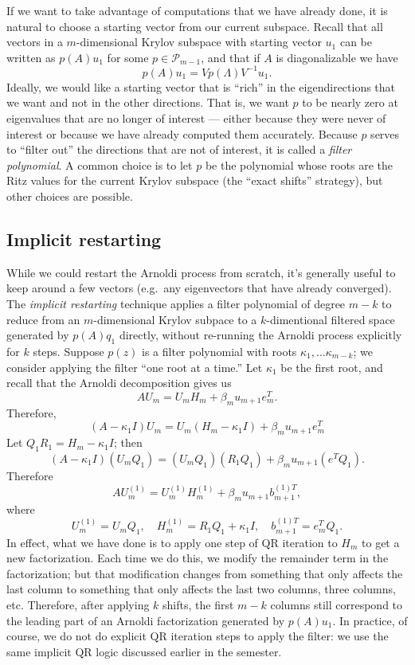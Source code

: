 \documentclass[12pt, leqno]{article} %
\begin{document}
If we want to take advantage of computations that we have already
done, it is natural to choose a starting vector from our current
subspace.  Recall that all vectors in a $m$-dimensional Krylov
subspace with starting vector $u_1$ can be written as $p(A) u_1$ for
some $p \in \mathcal{P}_{m-1}$, and that if $A$ is diagonalizable we
have
\[
  p(A) u_1 = V p(\Lambda) V^{-1} u_1.
\]
Ideally, we would like a starting vector that is ``rich'' in the
eigendirections that we want and not in the other directions.  That is,
we want $p$ to be nearly zero at eigenvalues that are no longer of
interest --- either because they were never of interest or because we
have already computed them accurately.  Because $p$ serves to ``filter
out'' the directions that are not of interest, it is called
a {\em filter polynomial}.  A common choice is to let $p$ be the
polynomial whose roots are the Ritz values for the current Krylov
subspace (the ``exact shifts'' strategy), but other choices are possible.

\subsection{Implicit restarting}

While we could restart the Arnoldi process from scratch, it's
generally useful to keep around a few vectors (e.g.~any eigenvectors
that have already converged).  The {\em implicit restarting} technique
applies a filter polynomial of degree $m-k$ to reduce from an
$m$-dimensional Krylov subpace to a $k$-dimentional filtered space
generated by $p(A) q_1$ directly, without re-running the Arnoldi
process explicitly for $k$ steps.  Suppose $p(z)$ is a filter
polynomial with roots $\kappa_1, \ldots \kappa_{m-k}$; we consider
applying the filter ``one root at a time.''  Let $\kappa_1$ be the
first root, and recall that the Arnoldi decomposition gives us
\[
  A U_m = U_m H_m + \beta_m u_{m+1} e_m^T.
\]
Therefore,
\[
  (A-\kappa_1 I) U_m = U_m (H_m - \kappa_1 I) + \beta_m u_{m+1} e_m^T
\]
Let $Q_1 R_1 = H_m - \kappa_1 I$; then
\[
  (A-\kappa_1 I) (U_m Q_1) = (U_m Q_1) (R_1 Q_1) + \beta_m u_{m+1} (e^T Q_1).
\]
Therefore
\[
  A U_m^{(1)} = U_m^{(1)} H_m^{(1)} + \beta_m u_{m+1} b_{m+1}^{(1) T},
\]
where
\[
  U_m^{(1)} = U_m Q_1, \quad
  H_m^{(1)} = R_1 Q_1 + \kappa_1 I, \quad
  b_{m+1}^{(1) T} = e_m^T Q_1.
\]
In effect, what we have done is to apply one step of QR iteration to
$H_m$ to get a new factorization.  Each time we do this, we modify the
remainder term in the factorization; but that modification changes
from something that only affects the last column to something that
only affects the last two columns, three columns, etc.  Therefore,
after applying $k$ shifts, the first $m-k$ columns still correspond to
the leading part of an Arnoldi factorization generated by $p(A) u_1$.
In practice, of course, we do not do explicit QR iteration steps to
apply the filter: we use the same implicit QR logic discussed earlier
in the semester.
\end{document}
